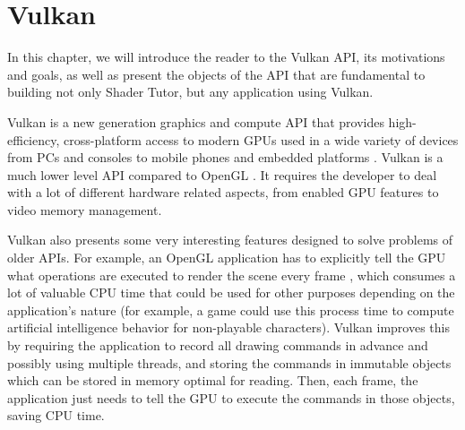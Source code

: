 \chapter{Vulkan}
In this chapter, we will introduce the reader to the Vulkan API, its motivations and goals, as well as present the objects of the API that are fundamental to building not only Shader Tutor, but any application using Vulkan.

Vulkan is a new generation graphics and compute API that provides high-efficiency, cross-platform access to modern GPUs used in a wide variety of devices from PCs and consoles to mobile phones and embedded platforms \cite{vulkan}. Vulkan is a much lower level API compared to OpenGL \cite{sellers:2016}. It requires the developer to deal with a lot of different hardware related aspects, from enabled GPU features to video memory management.

Vulkan also presents some very interesting features designed to solve problems of older APIs. For example, an OpenGL application has to explicitly tell the GPU what operations are executed to render the scene every frame \cite{opengl_spec}, which consumes a lot of valuable CPU time that could be used for other purposes depending on the application's nature (for example, a game could use this process time to compute artificial intelligence behavior for non-playable characters). Vulkan improves this by requiring the application to record all drawing commands in advance and possibly using multiple threads, and storing the commands in immutable objects which can be stored in memory optimal for reading. Then, each frame, the application just needs to tell the GPU to execute the commands in those objects, saving CPU time.

